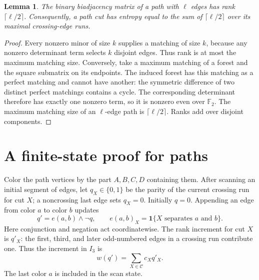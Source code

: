 \documentclass[11pt,letterpaper]{article}
\newtheorem{lemma}[theorem]{Lemma}
\newcommand{\F}{\mathbb F_2}
\newcommand{\Ithree}{I_3}
\begin{document}
\begin{lemma}\label{lem:pathrank}
The binary biadjacency matrix of a path with $\ell$ edges has rank $\lceil\ell/2\rceil$. Consequently, a path cut has entropy equal to the sum of $\lceil\ell/2\rceil$ over its maximal crossing-edge runs.
\end{lemma}
\begin{proof}
Every nonzero minor of size $k$ supplies a matching of size $k$, because any nonzero determinant term selects $k$ disjoint edges. Thus rank is at most the maximum matching size. Conversely, take a maximum matching of a forest and the square submatrix on its endpoints. The induced forest has this matching as a perfect matching and cannot have another: the symmetric difference of two distinct perfect matchings contains a cycle. The corresponding determinant therefore has exactly one nonzero term, so it is nonzero even over $\F$. The maximum matching size of an $\ell$-edge path is $\lceil\ell/2\rceil$. Ranks add over disjoint components.
\end{proof}

\section{A finite-state proof for paths}
Color the path vertices by the part $A,B,C,D$ containing them. After scanning an initial segment of edges, let $q_X\in\{0,1\}$ be the parity of the current crossing run for cut $X$; a noncrossing last edge sets $q_X=0$. Initially $q=0$. Appending an edge from color $a$ to color $b$ updates
\begin{equation}\label{eq:update}
 q'=e(a,b)\mathbin{\wedge}\neg q,\qquad
 e(a,b)_X=\mathbf1\{X\text{ separates }a\text{ and }b\}.
\end{equation}
Here conjunction and negation act coordinatewise. The rank increment for cut $X$ is $q'_X$: the first, third, and later odd-numbered edges in a crossing run contribute one. Thus the increment in $\Ithree$ is
\[
 w(q')=\sum_{X\in\mathcal C}c_Xq'_X.
\]
The last color $a$ is included in the scan state.
\end{document}
